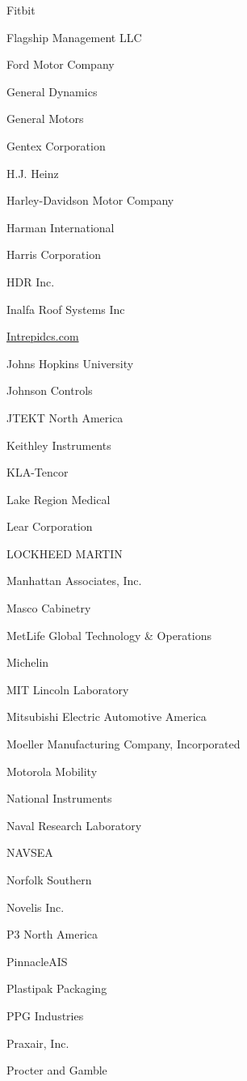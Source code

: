 \documentclass[twoside]{article}
\begin{document}
\begin{center}
\begin{multicols}{5}
\begin{FlushLeft}
\begin{compactitem}
\item Fitbit
\item Flagship Management LLC
\item Ford Motor Company
\item General Dynamics
\item General Motors
\item Gentex Corporation
\item H.J. Heinz
\item Harley-Davidson Motor Company
\item Harman International
\item Harris Corporation
\item HDR Inc.
\item Inalfa Roof Systems Inc
\item \url{Intrepidcs.com}
\item Johns Hopkins University
\item Johnson Controls
\item JTEKT North America
\item Keithley Instruments
\item KLA-Tencor
\item Lake Region Medical
\item Lear Corporation
\item LOCKHEED MARTIN
\item Manhattan Associates, Inc.
\item Masco Cabinetry
\item MetLife Global Technology \& Operations
\item Michelin
\item MIT Lincoln Laboratory
\item Mitsubishi Electric Automotive America
\item Moeller Manufacturing Company, Incorporated
\item Motorola Mobility
\item National Instruments
\item Naval Research Laboratory
\item NAVSEA
\item Norfolk Southern
\item Novelis Inc.
\item P3 North America
\item PinnacleAIS
\item Plastipak Packaging
\item PPG Industries
\item Praxair, Inc.
\item Procter and Gamble

\end{compactitem}
\end{FlushLeft}
\end{multicols}
\end{center}
\end{document}

